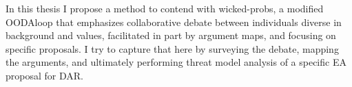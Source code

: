 In this thesis I propose a method to contend with \acp{wicked-prob}, a modified \ac{OODAloop} that emphasizes
collaborative debate between individuals diverse in background and values, facilitated in part by argument maps, and
focusing on specific proposals. I try to capture that here by surveying the debate, mapping the arguments, and
ultimately performing threat model analysis of a specific \ac{EA} proposal for \acl{DAR}.










